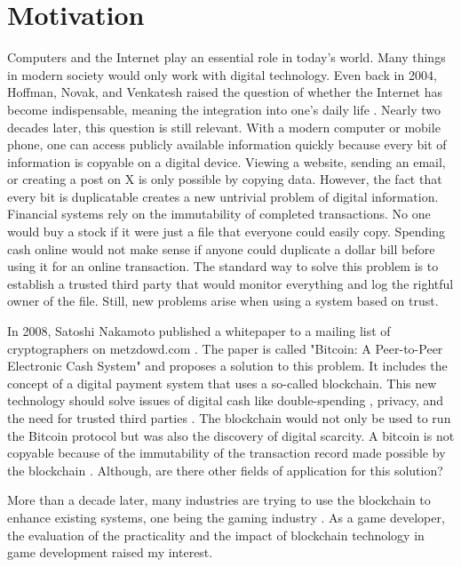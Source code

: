 \chapter{Motivation}

Computers and the Internet play an essential role in today's world. 
Many things in modern society would only work with digital technology.
Even back in 2004, Hoffman, Novak, and Venkatesh raised the question of whether the Internet has become indispensable, meaning the integration into one's daily life \cite{hoffman2004}.
Nearly two decades later, this question is still relevant.
With a modern computer or mobile phone, one can access publicly available information quickly because every bit of information is copyable on a digital device.
Viewing a website, sending an email, or creating a post on X is only possible by copying data.
However, the fact that every bit is duplicatable creates a new untrivial problem of digital information.
Financial systems rely on the immutability of completed transactions. 
No one would buy a stock if it were just a file that everyone could easily copy.
Spending cash online would not make sense if anyone could duplicate a dollar bill before using it for an online transaction.
The standard way to solve this problem is to establish a trusted third party that would monitor everything and log the rightful owner of the file.
Still, new problems arise when using a system based on trust.

In 2008, Satoshi Nakamoto published a whitepaper to a mailing list of cryptographers on metzdowd.com \cite{nakamotoemail_1}.
The paper is called "Bitcoin: A Peer-to-Peer Electronic Cash System" \cite{nakamoto2008} and proposes a solution to this problem. 
It includes the concept of a digital payment system that uses a so-called blockchain.
This new technology should solve issues of digital cash like double-spending \cite{chowan2021}, privacy, and the need for trusted third parties \cite{Douceur2002}.
The blockchain would not only be used to run the Bitcoin protocol but was also the discovery of digital scarcity.
A bitcoin is not copyable because of the immutability of the transaction record made possible by the blockchain \cite{popovski2014}.
Although, are there other fields of application for this solution?

More than a decade later, many industries are trying to use the blockchain to enhance existing systems, one being the gaming industry \cite{fowler2021}.
As a game developer, the evaluation of the practicality and the impact of blockchain technology in game development raised my interest.